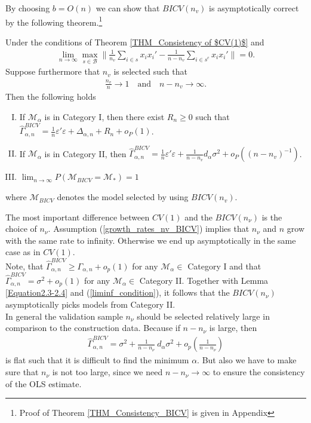 \documentclass[Research_Module_ES.tex]{subfiles}
\begin{document}
By choosing $b=O(n)$ we can show that $BICV(n_v)$ is asymptotically correct by the following theorem.\footnote{Proof of Theorem \ref{THM_Consistency_BICV} is given in Appendix }
\begin{thm}
	\label{THM_Consistency_BICV}
Under the conditions of Theorem \ref{THM_Consistency of $CV(1)$} and
\begin{align}
\lim_{n\to\infty} \max_{s\in \mathcal{B}}\biggl\lVert \frac{1}{n_v}\sum_{i\in s}x_ix_i' - \frac{1}{n-n_v}\sum_{i\in s^c}x_ix_i'\biggr\rVert =0. \label{gram_matrix_condition_BICV}
\end{align}
Suppose furthermore that $n_v$ is selected such that
\begin{align}
\frac{n_v}{n}\to 1 \quad \textrm{and} \quad n-n_v \to \infty. \label{growth_rates_nv_BICV}
\end{align}
Then the following holds
\begin{enumerate}[(I)]
\item If $\mathcal{M}_\alpha$ is in Category I, then there exist $R_n \ge 0$ such that $\hat{\Gamma}_{\alpha,n}^{BICV} = \frac{1}{n}\varepsilon'\varepsilon + \Delta_{\alpha,n} + R_n + o_P(1)$.
\item If $\mathcal{M}_\alpha$ is in Category II, then $\hat{\Gamma}_{\alpha,n}^{BICV} = \frac{1}{n}\varepsilon'\varepsilon + \frac{1}{n-n_v}d_\alpha\sigma^2  + o_P((n-n_v)^{-1})$.
\item $\lim_{n\to\infty}P(\mathcal{M}_{BICV}=\mathcal{M}_\ast) = 1$
\end{enumerate}
where $\mathcal{M}_{BICV}$ denotes the model selected by using $BICV(n_v)$.
\end{thm}
The most important difference between $CV(1)$ and the $BICV(n_\nu)$ is the choice of $n_\nu$. Assumption (\ref{growth_rates_nv_BICV}) implies that $n_\nu$ and $n$ grow with the same rate to infinity. Otherwise we end up asymptotically in the same case as in $CV(1)$.\\

Note, that $\hat{\Gamma}_{\alpha,n}^{BICV}\geq\Gamma_{\alpha,n}+o_p(1)$ for any $\mathcal{M}_\alpha\in$ Category I and that $\hat{\Gamma}_{\alpha,n}^{BICV}=\sigma^2+o_p(1)$ for any $\mathcal{M}_\alpha\in$ Category II. Together with Lemma \ref{Equation2.3-2.4} and (\ref{liminf_condition}), it follows that the $BICV(n_\nu)$ asymptotically picks models from Category II.\\

In general the validation sample $n_\nu$ should be selected relatively large in comparison to the construction data. Because if $n-n_\nu$ is large, then 
\begin{align*}
\hat{\Gamma}^{BICV}_{\alpha,n}=\sigma^2+\frac{1}{n-n_\nu}~d_\alpha\sigma^2+o_p\left(\frac{1}{n-n_\nu}\right)
\end{align*}
is flat such that it is difficult to find the minimum $\alpha$. But also we have to make sure that $n_\nu$ is not too large, since we need $n-n_\nu\to\infty$ to ensure the consistency of the OLS estimate.\\
\end{document}

